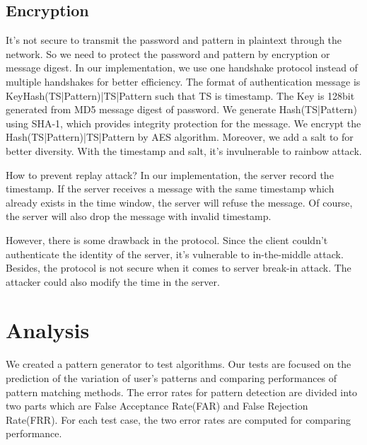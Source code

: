 \documentclass[twocolumn,showpacs,%
  nofootinbib,aps,%
  eqsecnum,prd,notitlepage,showkeys,10pt]{revtex4-1}
\begin{document}
\subsection{Encryption}
It's not secure to transmit the password and pattern in plaintext through the network. So we need to protect the password and pattern by encryption or message digest. In our implementation, we use one handshake protocol instead of multiple handshakes for better efficiency. The format of authentication message is Key{Hash(TS|Pattern)|TS|Pattern} such that TS is timestamp. The Key is 128bit generated from MD5 message digest of password. We generate Hash(TS|Pattern) using SHA-1, which provides integrity protection for the message. We encrypt the Hash(TS|Pattern)|TS|Pattern by AES algorithm. Moreover, we add a salt to for better diversity. With the timestamp and salt, it's invulnerable to rainbow attack.
\par
How to prevent replay attack? In our implementation, the server record the timestamp. If the server receives a message with the same timestamp which already exists in the time window, the server will refuse the message. Of course, the server will also drop the message with invalid timestamp.
\par
However, there is some drawback in the protocol. Since the client couldn't authenticate the identity of the server, it's vulnerable to in-the-middle attack. Besides, the protocol is not secure when it comes to server break-in attack. The attacker could also modify the time in the server.



\section{Analysis}
 We created a pattern generator to test algorithms. Our tests are focused on the prediction of the variation of user's patterns and comparing performances of pattern matching methods. The error rates for pattern detection are divided into two parts which are False Acceptance Rate(FAR) and False Rejection Rate(FRR)\cite{cho2000web}. For each test case, the two error rates are computed for comparing performance.
\end{document}
